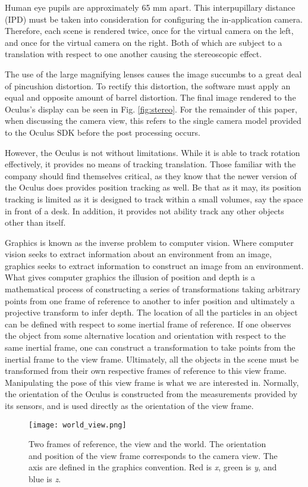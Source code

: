 Human eye pupils are approximately 65 mm apart.  This interpupillary distance
(IPD) must be taken into consideration for configuring the in-application
camera. Therefore, each scene is rendered twice, once for the virtual camera
on the left, and once for the virtual camera on the right. Both of which are
subject to a translation with respect to one another causing the stereoscopic
effect. 

The use of the large magnifying lenses causes the image succumbs to a great
deal of pincushion distortion. To rectify this distortion, the software must
apply an equal and opposite amount of barrel distortion. The final image
rendered to the Oculus's display can be seen in Fig. \ref{fig:stereo}. For the
remainder of this paper, when discussing the camera view, this refers to the
single camera model provided to the Oculus SDK before the post processing
occurs. 

However, the Oculus is not without limitations. While it is able to track
rotation effectively, it provides no means of tracking translation. Those
familiar with the company should find themselves critical, as they know that
the newer version of the Oculus does provides position tracking as well. Be
that as it may, its position tracking is limited as it is designed to track
within a small volumes, say the space in front of a desk. In addition, it
provides not ability track any other objects other than itself.

Graphics is known as the inverse problem to computer vision. Where computer
vision seeks to extract information about an environment from an image,
graphics seeks to extract information to construct an image from an
environment. What gives computer graphics the illusion of position and depth is
a mathematical process of constructing a series of transformations taking
arbitrary points from one frame of reference to another to infer position and
ultimately a projective transform to infer depth. The location of all the
particles in an object can be defined with respect to some inertial frame of
reference. If one observes the object from some alternative location and
orientation with respect to the same inertial frame, one can construct a
transformation to take points from the inertial frame to the view frame.
Ultimately, all the objects in the scene must be transformed from their own
respective frames of reference to this view frame. Manipulating the pose of
this view frame is what we are interested in. Normally, the orientation of
the Oculus is constructed from the measurements provided by its sensors,
and is used directly as the orientation of the view frame.

\begin{figure}[]
\centering
\texttt{[image: world\_view.png]}
\caption{Two frames of reference, the view and the world. The orientation and
position of the view frame corresponds to the camera view. The axis are
defined in the graphics convention. Red is \emph{x}, green is \emph{y}, 
and blue is \emph{z}.}
\label{fig:worldview}
\end{figure}

